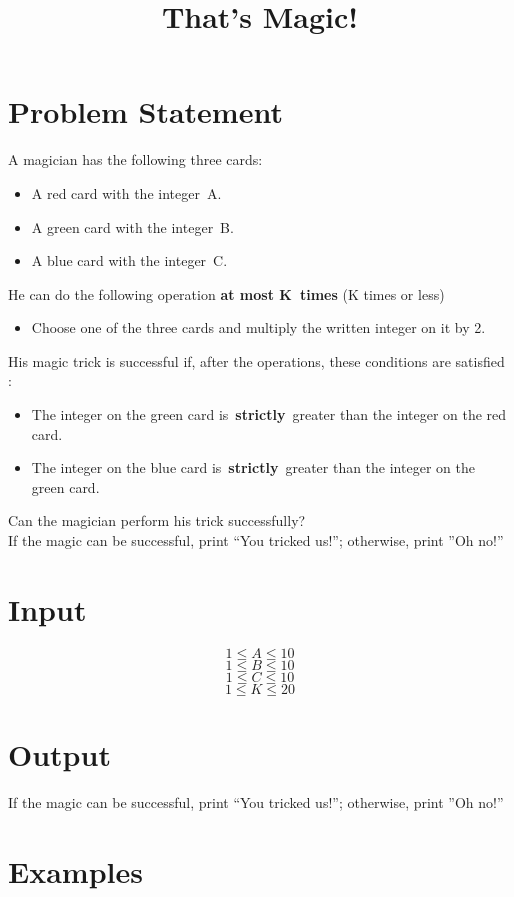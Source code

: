 \documentclass[10pt]{article}
\begin{document}
\title{That's Magic!}
 \date{}
\maketitle
\section{Problem Statement}
A magician has the following three cards:
\begin{itemize}
\item A red card with the integer A.
\item A green card with the integer B.
\item A blue card with the integer C.
\end{itemize}
He can do the following operation \textbf{at most K times} (K times or less)
\begin{itemize}
\item Choose one of the three cards and multiply the written integer on it by 2.
\end{itemize}
His magic trick is successful if, after the operations, these conditions are satisfied :
\begin{itemize}
\item The integer on the green card is \textbf{strictly} greater than the integer on the red card.
\item The integer on the blue card is \textbf{strictly} greater than the integer on the green card.
\end{itemize}
Can the magician perform his trick successfully?\\
If the magic can be successful, print “You tricked us!”; otherwise, print ”Oh no!”

\section{Input}
$$ 1\le A \le 10 $$
$$ 1\le B \le 10 $$
$$ 1\le C \le 10 $$
$$ 1\le K \le 20 $$
\section{Output}
If the magic can be successful, print “You tricked us!”; otherwise, print ”Oh no!”
\section{Examples}
\end{document}
